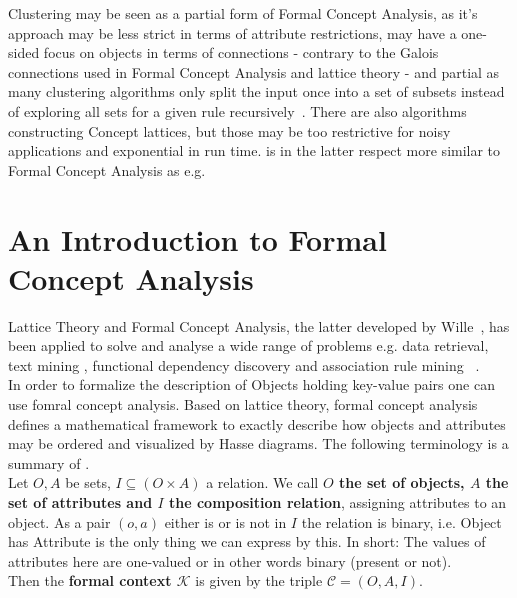 \noindent  Clustering may be seen as a partial form of Formal Concept Analysis, as it's approach may be less strict in terms of attribute restrictions, may have a one-sided focus on objects in terms of connections - contrary to the Galois connections used in Formal Concept Analysis and lattice theory - and partial as many clustering algorithms only split the input once into a set of subsets instead of exploring all sets for a given rule recursively~\cite{ignatov2012concept}.
There are also algorithms constructing Concept lattices, but those may be too restrictive for noisy applications and exponential in run time\cite{doi:10.1111/j.1467-8640.1995.tb00031.x}. is in the latter respect more similar to Formal Concept Analysis as e.g. 


\section{An Introduction to Formal Concept Analysis}\label{\positionnumber}
Lattice Theory and Formal Concept Analysis, the latter developed by Wille~\cite{wille1982restructuring}, has been applied to solve and analyse a wide range of problems e.g. data retrieval, text mining , functional dependency discovery and association rule mining ~\cite{poelmans2012text, soergel1967mathematical, spoerri1993infocrystal, godin1993experimental, godin1993building, carpineto2004exploiting, carpineto2003mining, ganascia1987charade, oosthuizen1988induction, xie2002concept}. \\
In order to formalize the description of Objects holding key-value pairs one can use fomral concept analysis. Based on lattice theory, formal concept analysis defines a mathematical framework to exactly describe how objects and attributes may be ordered and visualized by Hasse diagrams. The following terminology is a summary of \cite{ganter2012formal}. \\

Let $O, A$ be sets, $I \subseteq (O \times A)$ a relation. We call \textbf{$O$ the set of objects, $A$ the set of attributes and $I$ the composition relation}, assigning attributes to an object. As a pair $(o, a)$ either is or is not in $I$ the relation is binary, i.e. Object has Attribute is the only thing we can express by this. In short: The values of attributes here are one-valued or in other words binary (present or not). \\

Then the \textbf{formal context $\mathcal{K}$} is given by the triple $\mathcal{C} = (O, A, I)$. 

